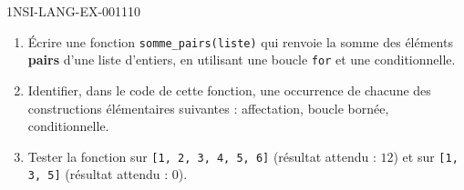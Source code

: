 \begin{exercice}{1NSI-LANG-EX-001}{1}{10}
\begin{enumerate}
  \item Écrire une fonction \lstinline{somme_pairs(liste)} qui renvoie la somme des éléments \textbf{pairs} d'une liste d'entiers, en utilisant une boucle \lstinline{for} et une conditionnelle.
  \item Identifier, dans le code de cette fonction, une occurrence de chacune des constructions élémentaires suivantes : affectation, boucle bornée, conditionnelle.
  \item Tester la fonction sur \lstinline{[1, 2, 3, 4, 5, 6]} (résultat attendu : $12$) et sur \lstinline{[1, 3, 5]} (résultat attendu : $0$).
\end{enumerate}
\end{exercice}
